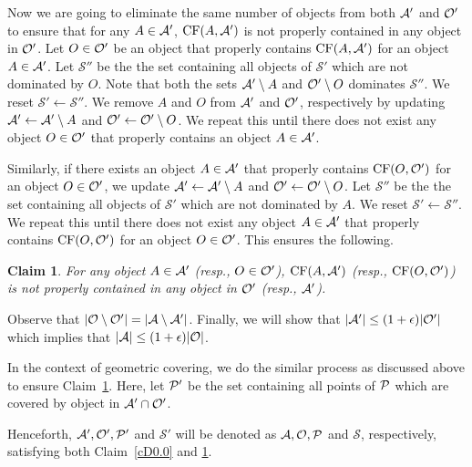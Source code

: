 \documentclass[a4paper,11pt]{article}
\DeclareMathOperator{\CF}{CF}
\newtheorem{claim}{Claim}
\begin{document}
Now we are going to eliminate {the} same number of objects from both ${\cal A}'$ and 
${\cal O}'$ to ensure that for any $A\in  {\cal A}'$,  $\CF(A, {\cal A}')$ is not properly
  contained in any object in ${\cal  O}'$.
 Let $O\in  {\cal O}'$ be an object that properly contains $\CF(A, {\cal A}')$ for an object $A\in {\cal A}'$. Let  $\mathscr{S}''$ be the the set containing  all objects of $\mathscr{S}'$ which
are not dominated by $O$. Note that both the sets ${\cal A}'\setminus A$ and ${\cal O}'\setminus O$ dominates $\mathscr{S}''$.
We reset $\mathscr{S}'\gets \mathscr{S}''$.
   We remove $A$ and $O$ from ${\cal A}'$ and ${\cal O}'$, respectively by  updating {${\cal A'}\gets{\cal A}'\setminus A$} and ${\cal O}'\gets {\cal O}'\setminus O$. We repeat this until there does not exist any object $O\in \cal{O}'$ that properly contains an object  $A\in {\cal A}'$. 
  
Similarly, if there exists an object $A\in {\cal A}'$ that properly contains $\CF(O, {\cal O}')$ for an object $O \in {\cal O}'$, we  update ${\cal A}'\gets{\cal A}'\setminus A$ and ${\cal O}'\gets{\cal O}'\setminus O$.  Let  $\mathscr{S}''$ be the the set containing  all objects of $\mathscr{S}'$ which
are not dominated by $A$. We reset $\mathscr{S}'\gets\mathscr{S}''$. We repeat this until there does not exist any object $A\in {\cal A}'$ that properly contains $\CF(O, {\cal O}')$ for an object $O \in {\cal O}'$. This ensures the following. 

\begin{claim}\label{cD0.1}
 For any object $A\in  {\cal A}'$ (resp., $O\in {\cal O}'$),  $\CF(A, {\cal A}')$ (resp.,  $\CF(O, {\cal O}')$)  is not properly
  contained in any object in ${\cal O}'$  (resp.,  $ {\cal A}'$).
\end{claim}


Observe that $|\cal{O}\setminus \cal{O}'|=|\cal{A}\setminus \cal{A}'|$.
Finally, we  will show that  $|{\cal A}'|\leq (1+\epsilon) |{\cal O}'|$ which implies 
that $|{\cal A}|\leq (1+\epsilon) |{\cal O}|$. 

In the context of geometric covering,  we do the similar process as discussed above to ensure Claim~\ref{cD0.1}.  Here, let ${\cal P}'$ be the set containing all 
points of $\cal P$ which  are
covered by
object in ${\cal A}'\cap {\cal O}'$.

{Henceforth, ${\cal A}',{\cal O}', {\cal P}'$ and $\mathscr{S}'$ will be denoted as ${\cal A},{\cal O}, {\cal P}$ and $\mathscr{S}$, respectively, satisfying both Claim~\ref{cD0.0} and \ref{cD0.1}.}
\end{document}
